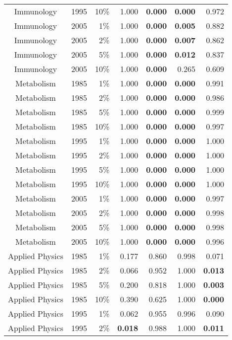 \documentclass{article}
\begin{document}
\begin{table}
\begin{centering}
{\begin{tabular}{|c rrrrr r|}
Immunology & 1995 & 10\% & 1.000 & \textbf{0.000} & \textbf{0.000} & 0.972 \\ 
Immunology & 2005 & 1\% & 1.000 & \textbf{0.000} & \textbf{0.005} & 0.882 \\ 
Immunology & 2005 & 2\% & 1.000 & \textbf{0.000} & \textbf{0.007} & 0.862 \\ 
Immunology & 2005 & 5\% & 1.000 & \textbf{0.000} & \textbf{0.012} & 0.837 \\ 
Immunology & 2005 & 10\% & 1.000 & \textbf{0.000} & 0.265 & 0.609 \\ 
Metabolism & 1985 & 1\% & 1.000 & \textbf{0.000} & \textbf{0.000} & 0.991 \\ 
Metabolism & 1985 & 2\% & 1.000 & \textbf{0.000} & \textbf{0.000} & 0.986 \\ 
Metabolism & 1985 & 5\% & 1.000 & \textbf{0.000} & \textbf{0.000} & 0.999 \\ 
Metabolism & 1985 & 10\% & 1.000 & \textbf{0.000} & \textbf{0.000} & 0.997 \\ 
Metabolism & 1995 & 1\% & 1.000 & \textbf{0.000} & \textbf{0.000} & 1.000 \\ 
Metabolism & 1995 & 2\% & 1.000 & \textbf{0.000} & \textbf{0.000} & 1.000 \\ 
Metabolism & 1995 & 5\% & 1.000 & \textbf{0.000} & \textbf{0.000} & 1.000 \\ 
Metabolism & 1995 & 10\% & 1.000 & \textbf{0.000} & \textbf{0.000} & 1.000 \\ 
Metabolism & 2005 & 1\% & 1.000 & \textbf{0.000} & \textbf{0.000} & 0.997 \\ 
Metabolism & 2005 & 2\% & 1.000 & \textbf{0.000} & \textbf{0.000} & 0.998 \\ 
Metabolism & 2005 & 5\% & 1.000 & \textbf{0.000} & \textbf{0.000} & 0.998 \\ 
Metabolism & 2005 & 10\% & 1.000 & \textbf{0.000} & \textbf{0.000} & 0.996 \\ 
Applied Physics & 1985 & 1\% & 0.177 & 0.860 & 0.998 & 0.071 \\ 
Applied Physics & 1985 & 2\% & 0.066 & 0.952 & 1.000 & \textbf{0.013} \\ 
Applied Physics & 1985 & 5\% & 0.200 & 0.818 & 1.000 & \textbf{0.003} \\ 
Applied Physics & 1985 & 10\% & 0.390 & 0.625 & 1.000 & \textbf{0.000} \\ 
Applied Physics & 1995 & 1\% & 0.062 & 0.955 & 0.996 & 0.090 \\ 
Applied Physics & 1995 & 2\% & \textbf{0.018} & 0.988 & 1.000 & \textbf{0.011} \\ 

\end{tabular}}
\end{centering}
\end{table}
\end{document}
